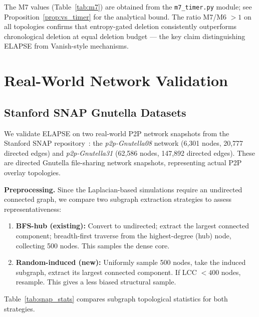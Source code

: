 \documentclass[review,12pt]{elsarticle}
\begin{document}
\noindent
The M7 values (Table~\ref{tab:m7}) are obtained from the \texttt{m7\_timer.py}
module; see Proposition~\ref{prop:vs_timer} for the analytical bound. The
ratio M7/M6 $> 1$ on all topologies confirms that entropy-gated deletion
consistently outperforms chronological deletion at equal deletion budget ---
the key claim distinguishing ELAPSE from Vanish-style mechanisms.

\section{Real-World Network Validation}
\label{sec:snap}

\subsection{Stanford SNAP Gnutella Datasets}

We validate ELAPSE on two real-world P2P network snapshots from the
Stanford SNAP repository~\cite{snapnets,leskovec2007graph}: the
\emph{p2p-Gnutella08} network (6,301 nodes, 20,777 directed edges) and
\emph{p2p-Gnutella31} (62,586 nodes, 147,892 directed edges). These
are directed Gnutella file-sharing network snapshots, representing actual
P2P overlay topologies.

\textbf{Preprocessing.} Since the Laplacian-based simulations require an
undirected connected graph, we compare two subgraph extraction strategies
to assess representativeness:
\begin{enumerate}
  \item \textbf{BFS-hub (existing):} Convert to undirected; extract the largest
        connected component; breadth-first traverse from the highest-degree
        (hub) node, collecting 500 nodes. This samples the dense core.
  \item \textbf{Random-induced (new):} Uniformly sample 500 nodes, take the
        induced subgraph, extract its largest connected component. If LCC
        $< 400$ nodes, resample. This gives a less biased structural sample.
\end{enumerate}
Table~\ref{tab:snap_stats} compares subgraph topological statistics for
both strategies.
\end{document}

